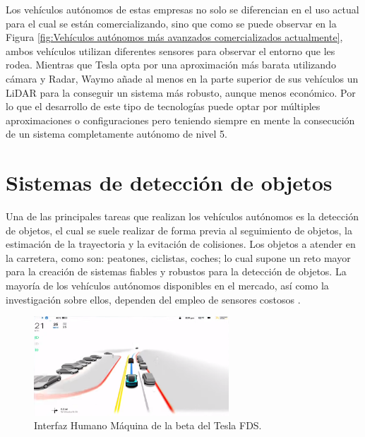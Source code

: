 Los vehículos autónomos de estas empresas no solo se diferencian en el uso actual para el cual se están comercializando, sino que como se puede observar en la Figura \ref{fig:Vehículos autónomos más avanzados comercializados actualmente}, ambos vehículos utilizan diferentes sensores para observar el entorno que les rodea. Mientras que Tesla opta por una aproximación más barata utilizando cámara y \ac{Radar}, Waymo añade al menos en la parte superior de sus vehículos un \ac{LiDAR} para la conseguir un sistema más robusto, aunque menos económico. Por lo que el desarrollo de este tipo de tecnologías puede optar por múltiples aproximaciones o configuraciones pero teniendo siempre en mente la consecución de un sistema completamente autónomo de nivel 5.

\section{Sistemas de detección de objetos}
\label{sec:Sistemas de detección de objetos}

Una de las principales tareas que realizan los vehículos autónomos es la detección de objetos, el cual se suele realizar de forma previa al seguimiento de objetos, la estimación de la trayectoria y la evitación de colisiones. Los objetos a atender en la carretera, como son: peatones, ciclistas, coches; lo cual supone un reto mayor para la creación de sistemas fiables y robustos para la detección de objetos. La mayoría de los vehículos autónomos disponibles en el mercado, así como la investigación sobre ellos, dependen del empleo de sensores costosos \cite{paper_object_detection}.

\begin{figure}[H]
    \centering
    \includegraphics[width=0.65\textwidth]{Book/figures/1_introduccion/HMI_Tesla.png}
    \caption{Interfaz Humano Máquina de la beta del Tesla FDS.}
    \label{fig:Interfaz Humano Máquina de la beta del Tesla FDS.}
\end{figure}


